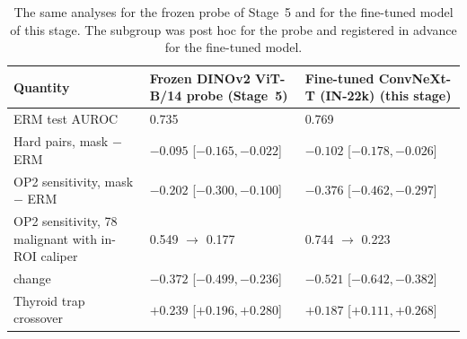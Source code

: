 \begin{table}[H]\centering\scriptsize
\caption{The same analyses for the frozen probe of Stage~5 and for the fine-tuned model of this stage. The subgroup was post hoc for the probe and registered in advance for the fine-tuned model.}\label{tab:cmp}
\begin{tabular}{p{5.6cm}p{4.2cm}p{4.2cm}}\toprule
Quantity & Frozen DINOv2 ViT-B/14 probe (Stage~5) & Fine-tuned ConvNeXt-T (IN-22k) (this stage) \\\midrule
ERM test AUROC & 0.735 & 0.769 \\
Hard pairs, mask $-$ ERM & $-0.095$ [$-0.165, -0.022$] & $-0.102$ [$-0.178, -0.026$] \\
OP2 sensitivity, mask $-$ ERM & $-0.202$ [$-0.300, -0.100$] & $-0.376$ [$-0.462, -0.297$] \\
OP2 sensitivity, 78 malignant with in-ROI caliper & 0.549 $\to$ 0.177 & 0.744 $\to$ 0.223 \\
\quad change & $-0.372$ [$-0.499, -0.236$] & $-0.521$ [$-0.642, -0.382$] \\
Thyroid trap crossover & $+0.239$ [$+0.196, +0.280$] & $+0.187$ [$+0.111, +0.268$] \\
\bottomrule\end{tabular}
\end{table}
